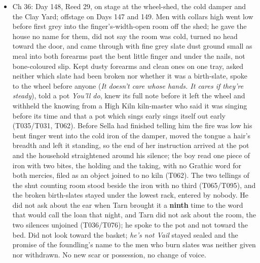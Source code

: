 \documentclass{design/chronicle}
\begin{document}
{\begin{itemize}[leftmargin=1.4em,itemsep=1pt,topsep=3pt,parsep=0pt]
\item Ch 36: Day 148, Reed 29, on stage at the wheel-shed, the cold damper and the Clay Yard; offstage on Days 147 and 149. Men with collars high went low before first grey into the finger’s-width-open room off the shed; he gave the house no name for them, did not say the room was cold, turned no head toward the door, and came through with fine grey slate dust ground small as meal into both forearms past the bent little finger and under the nails, not bone-coloured slip. Kept dusty forearms and clean ones on one tray, asked neither which slate had been broken nor whether it was a birth-slate, spoke to the wheel before anyone (\emph{It doesn’t care whose hands. It cares if they’re steady}), told a pot \emph{You’ll do}, knew its full note before it left the wheel and withheld the knowing from a High Kiln kiln-master who said it was singing before its time and that a pot which sings early sings itself out early (T035/T031, T062). Before Sella had finished telling him the fire was low his bent finger went into the cold iron of the damper, moved the tongue a hair’s breadth and left it standing, so the end of her instruction arrived at the pot and the household straightened around his silence; the boy read one piece of iron with two bites, the holding and the taking, with no Grathic word for both mercies, filed as an object joined to no kiln (T062). The two tellings of the shut counting room stood beside the iron with no third (T065/T095), and the broken birth-slates stayed under the lowest rack, entered by nobody. He did not ask about the ear when Tarn brought it a \textbf{ninth} time to the word that would call the loan that night, and Tarn did not ask about the room, the two silences unjoined (T036/T076); he spoke to the pot and not toward the bed. Did not look toward the basket; \emph{he’s not Vail} stayed sealed and the promise of the foundling’s name to the men who burn slates was neither given nor withdrawn. No new scar or possession, no change of voice.

\end{itemize}

\begin{itemize}[leftmargin=1.4em,itemsep=1pt,topsep=3pt,parsep=0pt]


\end{itemize}}
\end{document}
